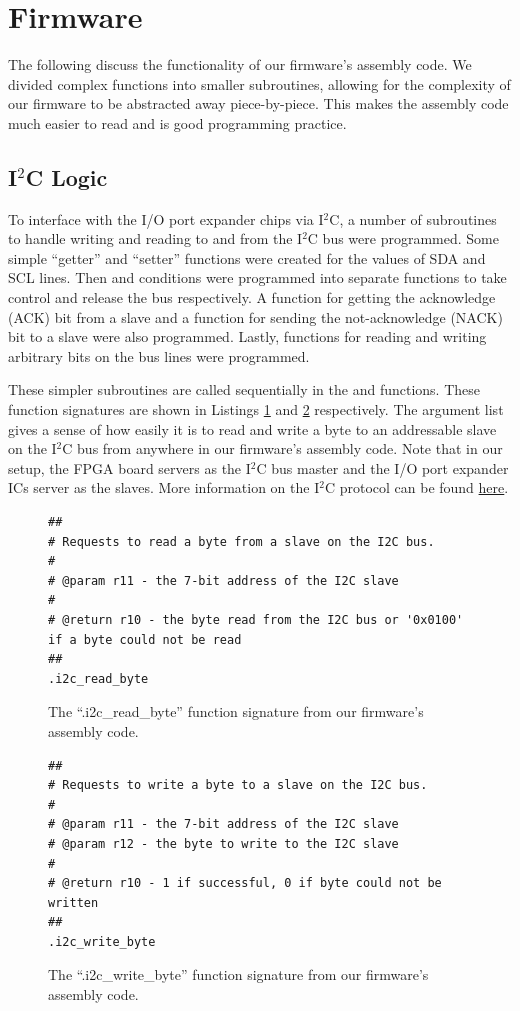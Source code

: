 \documentclass[conference]{IEEEtran}
\begin{document}
\section{Firmware}
The following discuss the functionality of our firmware's assembly code. We divided complex functions into smaller subroutines, allowing for the complexity of our firmware to be abstracted away piece-by-piece. This makes the assembly code much easier to read and is good programming practice.

\subsection{I\hspace{0.25mm}\texorpdfstring{$^{\textit{2}}$} CC Logic}
To interface with the I/O port expander chips via I$^2$C, a number of subroutines to handle writing and reading to and from the I$^2$C bus were programmed. Some simple ``getter'' and ``setter'' functions were created for the values of SDA and SCL lines. Then  and  conditions were programmed into separate functions to take control and release the bus respectively. A function for getting the acknowledge (ACK) bit from a slave and a function for sending the not-acknowledge (NACK) bit to a slave were also programmed. Lastly, functions for reading and writing arbitrary bits on the bus lines were programmed.

These simpler subroutines are called sequentially in the  and  functions. These function signatures are shown in Listings \ref{listing:assembly_i2c_read} and \ref{listing:assembly_i2c_write} respectively. The argument list gives a sense of how easily it is to read and write a byte to an addressable slave on the I$^2$C bus from anywhere in our firmware's assembly code. Note that in our setup, the FPGA board servers as the I$^2$C bus master and the I/O port expander ICs server as the slaves. More information on the I$^2$C protocol can be found \href{https://en.wikipedia.org/wiki/I\%C2\%B2C}{here}.
\begin{figure}
  \begin{lstlisting}
##
# Requests to read a byte from a slave on the I2C bus.
#
# @param r11 - the 7-bit address of the I2C slave
#
# @return r10 - the byte read from the I2C bus or '0x0100' if a byte could not be read
##
.i2c_read_byte
  \end{lstlisting}
  \caption{The ``.i2c\_read\_byte'' function signature from our firmware's assembly code.}
  \label{listing:assembly_i2c_read}
\end{figure}
\begin{figure}
  \begin{lstlisting}
##
# Requests to write a byte to a slave on the I2C bus.
#
# @param r11 - the 7-bit address of the I2C slave
# @param r12 - the byte to write to the I2C slave
#
# @return r10 - 1 if successful, 0 if byte could not be written
##
.i2c_write_byte
  \end{lstlisting}
  \caption{The ``.i2c\_write\_byte'' function signature from our firmware's assembly code.}
  \label{listing:assembly_i2c_write}
\end{figure}
\end{document}
